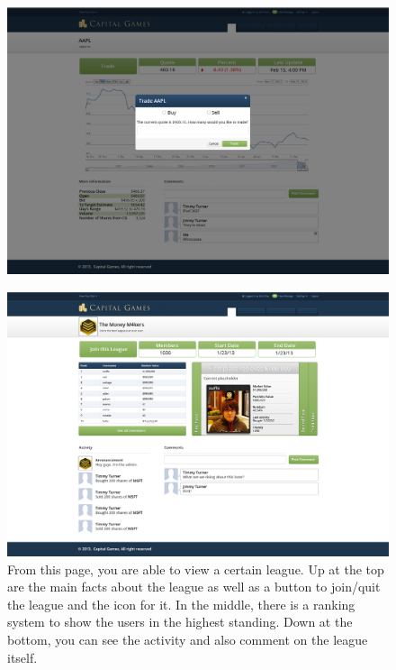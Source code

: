 \begin{figure}
\centering
\includegraphics[width=5.5in]{./mockups/JPEG/Tradepopup.jpg}
\end{figure}



\begin{figure}
\centering
\includegraphics[width=5.5in]{./mockups/JPEG/Leaguesthird.jpg}
\caption{From this page, you are able to view a certain league. Up at the top are the main facts about the league as well as a button to join/quit the league and the icon for it. In the middle, there is a ranking system to show the users in the highest standing. Down at the bottom, you can see the activity and also comment on the league itself.}
\end{figure}


